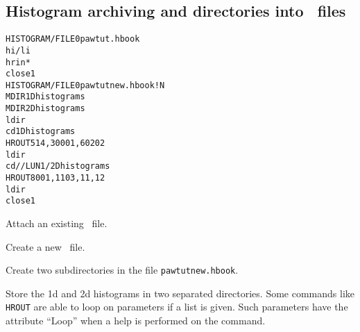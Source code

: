 \subsection*{Histogram archiving and directories into \HBOOK\ files}
\begin{alltt}
     HISTOGRAM/FILE 0 pawtut.hbook
      hi/li
      hrin  *
      close 1
     HISTOGRAM/FILE 0 pawtutnew.hbook ! N
     MDIR 1Dhistograms
     MDIR 2Dhistograms
      ldir
      cd 1Dhistograms
     HROUT 514,30001,60202
      ldir
      cd //LUN1/2Dhistograms
     HROUT 8001,1103,11,12
      ldir
      close 1
\end{alltt}{} 
\begin{DinglistE}
\item Attach an existing \HBOOK\ file.
\item Create a new \HBOOK\ file.
\item Create two subdirectories in the file {\tt pawtutnew.hbook}.
\item Store the 1d and 2d histograms in two separated directories.
      Some commands like {\tt HROUT} are able to loop
      on parameters if a list is given. Such parameters have the
      attribute ``Loop'' when a help is performed on the command.
\end{DinglistE}
\clearpage
